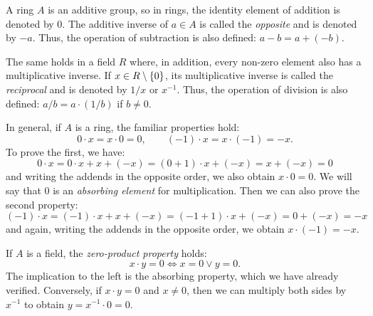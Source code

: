 A ring $A$ is an additive group, so in rings, the identity element of addition
is denoted by $0$. The additive inverse of $a\in A$ is called the
\emph{opposite} and is denoted by $-a$. Thus, the operation of subtraction is
also defined: $a-b = a+(-b)$.

The same holds in a field $R$ where, in addition, every non-zero element also
has a multiplicative inverse. If $x\in R\setminus{\left\{ 0 \right\}}$, its
multiplicative inverse is called the \emph{reciprocal} and is denoted by $1/x$
or $x^{-1}$. Thus, the operation of division is also defined: $a/b = a\cdot
(1/b)$ if $b\neq 0$.

In general, if $A$ is a ring, the familiar properties hold:
\[
  0\cdot x = x\cdot 0 = 0, \qquad
  (-1)\cdot x = x \cdot (-1) = -x.
\]
To prove the first, we have:
\[
  0\cdot x = 0\cdot x + x + (-x) = (0+1)\cdot x + (-x) = x + (-x) = 0
\]
and writing the addends in the opposite order, we also obtain $x\cdot 0 = 0$. We
will say that $0$ is an \emph{absorbing element}
%
%  
%
for multiplication. Then we can also prove the second property:
\[
   (-1)\cdot x = (-1)\cdot x + x + (-x) = (-1 + 1)\cdot x + (-x) = 0 + (-x) = -x
\]
and again, writing the addends in the opposite order, we obtain $x\cdot(-1)=-x$.

If $A$ is a field, the \emph{zero-product property} holds:
%
%
\[
  x\cdot y = 0 \iff x=0 \lor y=0.
\]
The implication to the left is the absorbing property, which we have already
verified. Conversely, if $x\cdot y = 0$ and $x\neq 0$, then we can multiply both
sides by $x^{-1}$ to obtain $y=x^{-1}\cdot 0 = 0$.

